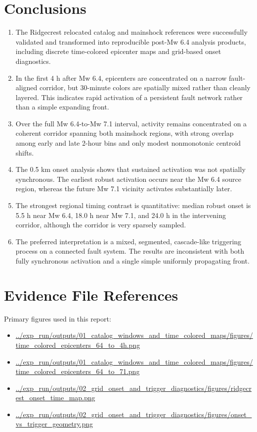 \documentclass[11pt]{article}
\begin{document}
\section{Conclusions}
\begin{enumerate}[leftmargin=1.5em]
    \item The Ridgecrest relocated catalog and mainshock references were successfully validated and transformed into reproducible post-Mw 6.4 analysis products, including discrete time-colored epicenter maps and grid-based onset diagnostics.

    \item In the first 4 h after Mw 6.4, epicenters are concentrated on a narrow fault-aligned corridor, but 30-minute colors are spatially mixed rather than cleanly layered. This indicates rapid activation of a persistent fault network rather than a simple expanding front.

    \item Over the full Mw 6.4-to-Mw 7.1 interval, activity remains concentrated on a coherent corridor spanning both mainshock regions, with strong overlap among early and late 2-hour bins and only modest nonmonotonic centroid shifts.

    \item The 0.5 km onset analysis shows that sustained activation was not spatially synchronous. The earliest robust activation occurs near the Mw 6.4 source region, whereas the future Mw 7.1 vicinity activates substantially later.

    \item The strongest regional timing contrast is quantitative: median robust onset is 5.5 h near Mw 6.4, 18.0 h near Mw 7.1, and 24.0 h in the intervening corridor, although the corridor is very sparsely sampled.

    \item The preferred interpretation is a mixed, segmented, cascade-like triggering process on a connected fault system. The results are inconsistent with both fully synchronous activation and a single simple uniformly propagating front.
\end{enumerate}

\section*{Evidence File References}
Primary figures used in this report:
\begin{itemize}[leftmargin=1.5em]
    \item \url{../exp_run/outputs/01_catalog_windows_and_time_colored_maps/figures/time_colored_epicenters_64_to_4h.png}
    \item \url{../exp_run/outputs/01_catalog_windows_and_time_colored_maps/figures/time_colored_epicenters_64_to_71.png}
    \item \url{../exp_run/outputs/02_grid_onset_and_trigger_diagnostics/figures/ridgecrest_onset_time_map.png}
    \item \url{../exp_run/outputs/02_grid_onset_and_trigger_diagnostics/figures/onset_vs_trigger_geometry.png}
\end{itemize}
\end{document}
